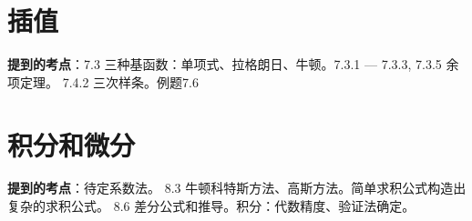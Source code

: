 \documentclass[14pt, letterpaper, UTF8, fontset=windowsnew, heading=true]{article}
\begin{document}
\section{插值}

\textbf{提到的考点}：7.3 三种基函数：单项式、拉格朗日、牛顿。7.3.1 --- 7.3.3, 7.3.5 余项定理。
7.4.2 三次样条。例题7.6

\section{积分和微分}

\textbf{提到的考点}：待定系数法。 8.3 牛顿科特斯方法、高斯方法。简单求积公式构造出复杂的求积公式。
8.6 差分公式和推导。积分：代数精度、验证法确定。
	
\end{document}
